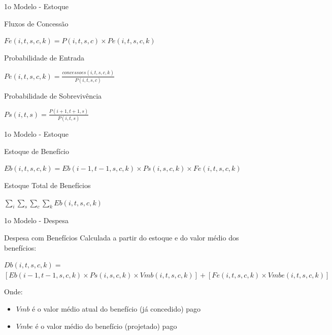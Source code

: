 \begin{frame}{1o Modelo - Estoque}
  \begin{block}{Fluxos de Concessão}
    \begin{center}
      $Fe(i,t,s,c,k) = P(i,t,s,c) \times Pe(i,t,s,c,k)$
    \end{center}
  \end{block}
  \begin{block}{Probabilidade de Entrada}
    \begin{center}
      $Pe(i,t,s,c,k) = \frac{concessoes(i,t,s,c,k)}{P(i,t,s,c)}$
    \end{center}
  \end{block}
  \begin{block}{Probabilidade de Sobrevivência}
    \begin{center}
      $Ps (i, t, s) = \frac{P(i+1, t+1, s)}{P(i,t,s)}$
    \end{center}
  \end{block}
\end{frame}

\begin{frame}{1o Modelo - Estoque}
  \begin{block}{Estoque de Benefício}
    \begin{center}
      $Eb(i, t, s, c, k) = Eb(i-1, t-1, s, c, k) \times Ps(i,s,c,k) \times
      Fe(i, t ,s, c, k)$
    \end{center}
  \end{block}
  \begin{block}{Estoque Total de Benefícios}
    \begin{center}
      $\sum_i \sum_s \sum_c \sum_k Eb(i,t,s,c,k)$
    \end{center}
  \end{block}
\end{frame}

\begin{frame}{1o Modelo - Despesa}
  \begin{block}{Despesa com Benefícios}
    Calculada a partir do estoque e do valor médio dos benefícios:
      \begin{center}
  \scriptsize
$Db(i,t,s,c,k) =$
$[Eb(i-1, t-1, s, c, k) \times Ps(i,s,c,k) \times Vmb(i,t,s,c,k)] + [Fe(i, t ,s, c, k) \times Vmbe(i,t,s,c,k)]$
      \end{center}
  \end{block}
  \scriptsize
    Onde:
    \begin{itemize}
      \item $Vmb$ é o valor médio atual do benefício (já concedido) pago
      \item $Vmbe$ é o valor médio do benefício (projetado) pago
    \end{itemize}
\end{frame}

